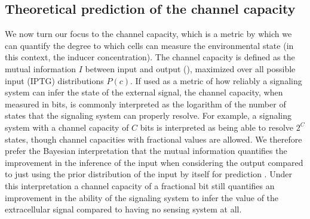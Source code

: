 \subsection{Theoretical prediction of the channel capacity}
\label{sec_channcap}

We now turn our focus to the channel capacity, which is a metric by which we can
quantify the degree to which cells can measure the environmental state (in this
context, the inducer concentration). The channel capacity is defined as the
mutual information $I$ between input and output (),
maximized over all possible input (IPTG) distributions $P(c)$. If used as a
metric of how reliably a signaling system can infer the state of the external
signal, the channel capacity, when measured in bits, is commonly interpreted as
the logarithm of the number of states that the signaling system can properly
resolve. For example, a signaling system with a channel capacity of $C$ bits is
interpreted as being able to resolve $2^C$ states, though channel capacities
with fractional values are allowed. We therefore prefer the Bayesian
interpretation that the mutual information quantifies the improvement in the
inference of the input when considering the output compared to just using the
prior distribution of the input by itself for prediction \cite{Voliotis2014a,
Bowsher2014}. Under this interpretation a channel capacity of a fractional bit
still quantifies an improvement in the ability of the signaling system to infer
the value of the extracellular signal compared to having no sensing system at
all.

